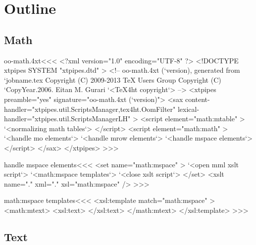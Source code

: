 \documentclass{article}
\begin{document}




\section{Outline}


\subsection{Math}








\<oo-math.4xt\><<<
<?xml version="1.0" encoding="UTF-8" ?>
<!DOCTYPE xtpipes SYSTEM "xtpipes.dtd" >
<!-- oo-math.4xt (`version), generated from `jobname.tex
     Copyright (C) 2009-2013 TeX Users Group
     Copyright (C) `CopyYear.2006. Eitan M. Gurari
`<TeX4ht copyright`> -->
<xtpipes preamble="yes" signature="oo-math.4xt (`version)">
   <sax content-handler="xtpipes.util.ScriptsManager,tex4ht.OomFilter" 
        lexical-handler="xtpipes.util.ScriptsManagerLH" >
      <script element="math:mtable" >
         `<normalizing math tables`>
      </script> 
      <script element="math:math" >
         `<handle mo elements`>
         `<handle mrow elements`>
         `<handle mspace elements`>
      </script> 
   </sax>
</xtpipes>
>>>







\<handle mspace elements\><<<
<set name="math:mspace" >
   `<open mml xslt script`>
   `<math:mspace templates`>
   `<close xslt script`>
</set>
<xslt name="." xml="." xsl="math:mspace" />
>>>


\<math:mspace templates\><<<
<xsl:template match="math:mspace" >
  <math:mtext>  
     <xsl:text> </xsl:text>
  </math:mtext>
</xsl:template> 
>>>




\subsection{Text}







\end{document}
